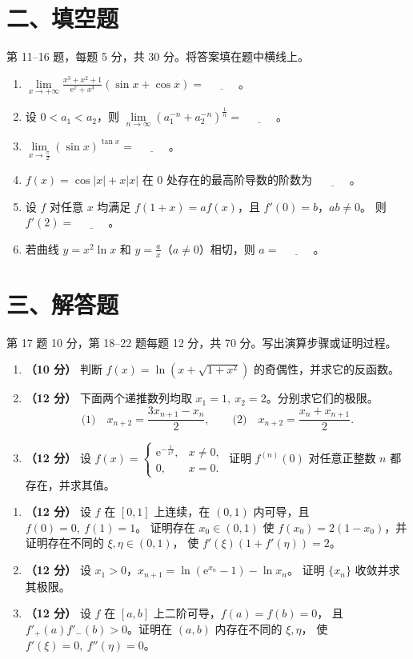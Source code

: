 \documentclass[UTF8,a4paper,zihao=-4,fontset=fandol]{ctexart}
\renewcommand{\lim}{\operatorname*{lim}\limits}
\newcommand{\blank}{\underline{\hspace{3em}}}
\newcommand{\fillsection}{%
  \section*{二、填空题}
  第 11--16 题，每题 5 分，共 30 分。将答案填在题中横线上。}
\newcommand{\solvesection}{%
  \newpage
  \section*{三、解答题}
  第 17 题 10 分，第 18--22 题每题 12 分，共 70 分。写出演算步骤或证明过程。}
\begin{document}
\fillsection
\begin{enumerate}[start=11]
\item $\displaystyle\lim_{x\to+\infty}\frac{x^3+x^2+1}{\mathrm{e}^x+x^3}(\sin x+\cos x)=\blank$。
\item 设 $0<a_1<a_2$，则 $\displaystyle\lim_{n\to\infty}(a_1^{-n}+a_2^{-n})^{\frac{1}{n}}=\blank$。
\item $\displaystyle\lim_{x\to\frac{\pi}{2}}(\sin x)^{\tan x}=\blank$。
\item $f(x)=\cos|x|+x|x|$ 在 $0$ 处存在的最高阶导数的阶数为 $\blank$。
\item 设 $f$ 对任意 $x$ 均满足 $f(1+x)=af(x)$，且 $f'(0)=b$，$ab\ne0$。
则 $f'(2)=\blank$。
\item 若曲线 $y=x^2\ln x$ 和 $y=\frac{a}{x}$（$a\ne0$）相切，则 $a=\blank$。
\end{enumerate}
\solvesection
\begin{enumerate}[start=17]
\item \textbf{（10 分）} 判断 $f(x)=\ln(x+\sqrt{1+x^2})$ 的奇偶性，并求它的反函数。
\vspace{4.5cm}
\item \textbf{（12 分）} 下面两个递推数列均取 $x_1=1,\ x_2=2$。分别求它们的极限。
\[
  \text{(1)}\quad x_{n+2}=\frac{3x_{n+1}-x_n}{2},
  \qquad
  \text{(2)}\quad x_{n+2}=\frac{x_n+x_{n+1}}{2}.
\]
\vspace{4.5cm}
\item \textbf{（12 分）} 设 $f(x)=\begin{cases}\mathrm{e}^{-\frac{1}{x^2}},&x\ne0,\\0,&x=0.\end{cases}$
证明 $f^{(n)}(0)$ 对任意正整数 $n$ 都存在，并求其值。
\end{enumerate}
\newpage
\begin{enumerate}[start=20]
\item \textbf{（12 分）} 设 $f$ 在 $[0,1]$ 上连续，在 $(0,1)$ 内可导，且 $f(0)=0,\ f(1)=1$。
证明存在 $x_0\in(0,1)$ 使 $f(x_0)=2(1-x_0)$，并证明存在不同的 $\xi,\eta\in(0,1)$，
使 $f'(\xi)(1+f'(\eta))=2$。
\vspace{5.5cm}
\item \textbf{（12 分）} 设 $x_1>0$，$x_{n+1}=\ln(\mathrm{e}^{x_n}-1)-\ln x_n$。
证明 $\{x_n\}$ 收敛并求其极限。
\vspace{5.5cm}
\item \textbf{（12 分）} 设 $f$ 在 $[a,b]$ 上二阶可导，$f(a)=f(b)=0$，
且 $f'_+(a)f'_-(b)>0$。证明在 $(a,b)$ 内存在不同的 $\xi,\eta$，
使 $f'(\xi)=0,\ f''(\eta)=0$。
\end{enumerate}
\end{document}
